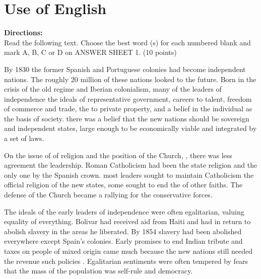 





\section{Use of English}

\noindent
\textbf{Directions:}\\
Read the following text. Choose the best word (s) for each numbered blank and mark A, B, C or D on ANSWER SHEET 1. (10 points)



\TiGanSpace


By 1830 the former Spanish and Portuguese colonies had become
independent nations. The roughly 20 million \cloze of these
nations looked \cloze to the future. Born in the crisis of the
old regime and Iberian colonialism, many of the leaders of
independence \cloze the ideals of representative government,
careers \cloze to talent, freedom of commerce and trade,
the \cloze to private property, and a belief in the individual as
the basis of society. \cloze there was a belief that the new
nations should be sovereign and independent states, large enough to be
economically viable and integrated by a \cloze set of laws.

On the issue of \cloze of religion and the position of the
Church, \cloze , there was less agreement \cloze the
leadership. Roman Catholicism had been the state religion and the only
one \cloze by the Spanish crown. \cloze most leaders
sought to maintain Catholicism \cloze the official religion of
the new states, some sought to end the \cloze of other faiths.
The defense of the Church became a rallying \cloze for the
conservative forces.

The ideals of the early leaders of independence were often egalitarian,
valuing equality of everything. Bolivar had received aid from Haiti and
had \cloze in return to abolish slavery in the areas he
liberated. By 1854 slavery had been abolished everywhere except
Spain's \cloze colonies. Early promises to end Indian tribute
and taxes on people of mixed origin came much \cloze because the
new nations still needed the revenue such policies \cloze.
Egalitarian sentiments were often tempered by fears that the mass of the
population was \cloze self-rule and democracy.


\newpage

